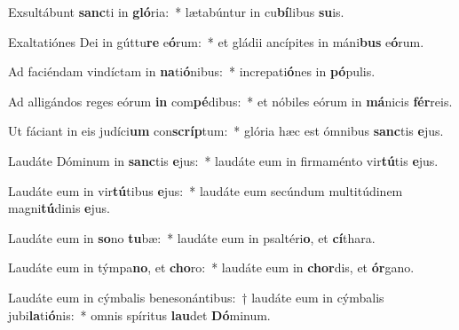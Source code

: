 \item Exsultábunt \textbf{sanc}ti in \textbf{gló}ria:~* lætabúntur in cu\textbf{bí}libus \textbf{su}is.
\item Exaltatiónes Dei in gúttu\textbf{re} e\textbf{ó}rum:~* et gládii ancípites in máni\textbf{bus} e\textbf{ó}rum.
\item Ad faciéndam vindíctam in \textbf{na}ti\textbf{ó}nibus:~* increpati\textbf{ó}nes in \textbf{pó}pulis.
\item Ad alligándos reges eórum \textbf{in} com\textbf{pé}dibus:~* et nóbiles eórum in \textbf{má}nicis \textbf{fér}reis.
\item Ut fáciant in eis judíci\textbf{um} con\textbf{scríp}tum:~* glória hæc est ómnibus \textbf{sanc}tis \textbf{e}jus.
\item Laudáte Dóminum in \textbf{sanc}tis \textbf{e}jus:~* laudáte eum in firmaménto vir\textbf{tú}tis \textbf{e}jus.
\item Laudáte eum in vir\textbf{tú}tibus \textbf{e}jus:~* laudáte eum secúndum multitúdinem magni\textbf{tú}dinis \textbf{e}jus.
\item Laudáte eum in \textbf{so}no \textbf{tu}bæ:~* laudáte eum in psaltéri\textbf{o}, et \textbf{cí}thara.
\item Laudáte eum in týmpa\textbf{no}, et \textbf{cho}ro:~* laudáte eum in \textbf{chor}dis, et \textbf{ór}gano.
\item Laudáte eum in cýmbalis benesonántibus:~† laudáte eum in cýmbalis jubi\textbf{la}ti\textbf{ó}nis:~* omnis spíritus \textbf{lau}det \textbf{Dó}minum.
